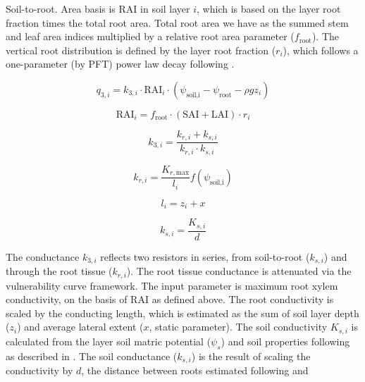 \documentclass[draft,linenumbers]{agujournal}
\begin{document}
Soil-to-root. Area basis is RAI in soil layer $i$, which is based on the layer root fraction times the
total root area. Total root area we have as the summed stem and leaf area indices multiplied by a relative
root area parameter ($f_{\text{root}}$).
The vertical root distribution is defined by the layer root fraction ($r_i$), which follows a one-parameter 
(by PFT) power law decay following \citet{jackson1996}.

\begin{linenomath*} \begin{equation}
q_{3,i} = k_{3,i} \cdot  \text{RAI}_i  \cdot \left( \psi_{\text{soil,i}}-\psi_{\text{root}}-\rho g z_i\right)
\end{equation} \end{linenomath*}
\begin{linenomath*} \begin{equation}
\text{RAI}_i=f_{\text{root}} \cdot \left( \text{SAI} + \text{LAI} \right) \cdot r_i
\label{eq:rai}
\end{equation} \end{linenomath*}
\begin{linenomath*} \begin{equation}
k_{3,i} = \dfrac{k_{r,i}+k_{s,i}}{k_{r,i}\cdot k_{s,i}}
\end{equation} \end{linenomath*}
\begin{linenomath*} \begin{equation}
k_{r,i} = \dfrac{K_{r,\text{max}}}{l_i} f \left(\psi_{\text{soil,i}}\right)
\end{equation} \end{linenomath*}
\begin{linenomath*} \begin{equation}
l_i = z_i + x
\end{equation} \end{linenomath*}
\begin{linenomath*} \begin{equation}
k_{s,i} = \dfrac{K_{s,i}}{d}
\end{equation} \end{linenomath*}

The conductance $k_{3,i}$ reflects two resistors in series, from soil-to-root ($k_{s,i}$) and through the
root tissue ($k_{r,i}$).
The root tissue conductance is attenuated via the vulnerability curve framework. 
The input parameter is maximum root xylem conductivity, on the basis of RAI as defined above.
The root conductivity is scaled by the conducting length, which is estimated as the sum of soil layer depth ($z_i$)
and average lateral extent ($x$, static parameter).
The soil conductivity $K_{s,i}$ is calculated from the layer soil matric potential ($\psi_s$) 
and soil properties following \citet{clapp1978} as described in \citet{oleson2013}.
The soil conductance ($k_{s,i}$) is the result of scaling the conductivity by $d$, 
 the distance between roots estimated following \citet{williams1996} and \citet{bonan2014}
\end{document}
